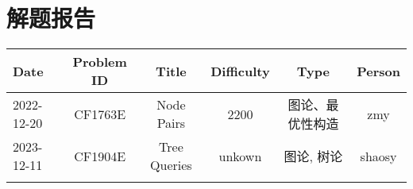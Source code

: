\chapter{解题报告}
\begin{center}
\begin{longtable}{l c c c c c }

Date & Problem ID & Title & Difficulty & Type & Person   \\ 
\hline
2022-12-20 & CF1763E & Node Pairs & 2200 & 图论、最优性构造 & zmy  \\
\hline
2023-12-11 & CF1904E & Tree Queries & unkown & 图论, 树论 & shaosy \\


\hline

\label{tab:practice_index}
\end{longtable}
\end{center}

